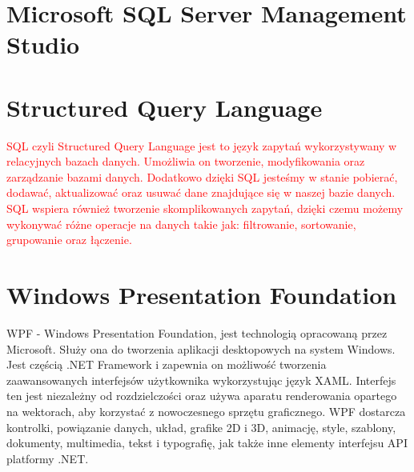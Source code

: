 \documentclass[12pt,twoside]{report}
\begin{document}
\section{Microsoft SQL Server Management Studio}

\section{Structured Query Language}
\textcolor{red} {SQL czyli Structured Query Language jest to język zapytań wykorzystywany w relacyjnych bazach danych. Umożliwia on tworzenie, modyfikowania oraz zarządzanie bazami danych. Dodatkowo dzięki SQL jesteśmy w stanie pobierać, dodawać, aktualizować oraz usuwać dane znajdujące się w naszej bazie danych. SQL wspiera również tworzenie skomplikowanych zapytań, dzięki czemu możemy wykonywać różne operacje na danych takie jak: filtrowanie, sortowanie, grupowanie oraz łączenie.}

\section{Windows Presentation Foundation}
WPF - Windows Presentation Foundation, jest technologią opracowaną przez Microsoft. Służy ona do tworzenia aplikacji desktopowych na system Windows. Jest częścią .NET Framework i zapewnia on możliwość tworzenia zaawansowanych interfejsów użytkownika wykorzystując język XAML. Interfejs ten jest niezależny od rozdzielczości oraz używa aparatu renderowania opartego na wektorach, aby korzystać z nowoczesnego sprzętu graficznego. WPF dostarcza kontrolki, powiązanie danych, układ, grafike 2D i 3D, animację, style, szablony, dokumenty, multimedia, tekst i typografię, jak także inne elementy interfejsu API platformy .NET. \cite{WPF}
\end{document}
